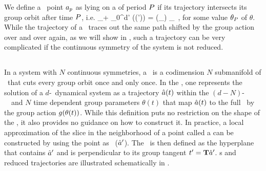We define a \statesp\ point $a_{p}$ as lying on a \emph{\rpo} of period $P$ if its trajectory intersects its group orbit after time $P$, i.e.
\beq
  \ssp_\rpprime  + \int_0^\pd d\tau' \vel(\ssp (\tau')) = \LieEl (\theta_\rpprime ) \ssp_\rpprime
  \,,
\noindent for some value $\theta_{P}$ of $\theta$. While the trajectory of a \rpo\ traces out the same path shifted
by the group action over and over again, as we will show in , such a trajectory can be very complicated if the
continuous symmetry of the system is not reduced.

\subsection{\Mslices}
\label{s-slice}

In a system with $N$ continuous symmetries, a \emph{\slice} \pSRed\ is a codimension $N$ submanifold 
of \pS\ that cuts every group orbit once and only once. In the \emph{\mslices}, one represents the solution
of a $d$-\dmn\ dynamical system as a trajectory $\hat{a} (t)$ within the
$(d-N)$-\dmn\ \slice\ and $N$ time dependent group parameters $\theta(t)$
that map $\hat{a} (t)$ to the full \statesp\ by the group action $g(\theta(t))$.
While this definition puts no restriction on the shape of the
\slice, it also provides no guidance on how to construct it.
In practice, a local approximation of the slice in the neighborhood of a point called a \emph{\slicePlane}
can be constructed by using the point as \template\ (${\hat{a}'}$). The \slicePlane\ is then defined as the hyperplane
that contains ${\hat{a}'}$ and is perpendicular to its group tangent $t'_{} = \mathbf{T} {\hat{a}'}$.
\SlicePlane s and reduced trajectories are illustrated schematically in .

